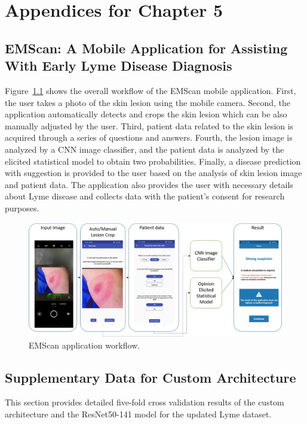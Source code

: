 \chapter{Appendices for Chapter 5}
\resumetocwriting
\section{EMScan: A Mobile Application for Assisting With Early Lyme Disease Diagnosis}\label{sec:emscan-desc}
Figure~\ref{app_workflow} shows the overall workflow of the EMScan mobile application. First, the user takes a photo of the skin lesion using the mobile camera. Second, the application automatically detects and crops the skin lesion which can be also manually adjusted by the user. Third, patient data related to the skin lesion is acquired through a series of questions and answers. Fourth, the lesion image is analyzed by a CNN image classifier, and the patient data is analyzed by the elicited statistical model to obtain two probabilities. Finally, a disease prediction with suggestion is provided to the user based on the analysis of skin lesion image and patient data. The application also provides the user with necessary details about Lyme disease and collects data with the patient’s consent for research purposes.
\begin{figure}[htb!]
	\begin{center}
		\includegraphics[width=\textwidth,keepaspectratio]{images/ongoing/app_workflow.png}
		\caption{EMScan application workflow.} \label{app_workflow}
	\end{center}
\end{figure}
\vfill\clearpage
\section{Supplementary Data for Custom Architecture}\label{sec:app-supply-custom}
This section provides detailed five-fold cross validation results of the custom architecture and the ResNet50-141 model for the updated Lyme dataset.
\stoptocwriting
